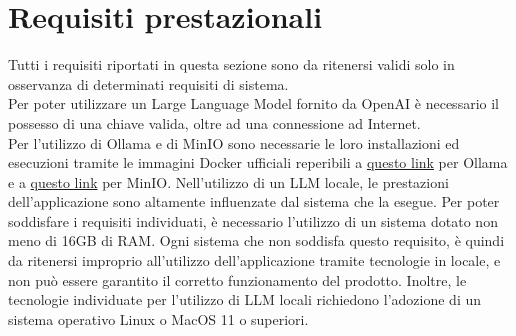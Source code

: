 \section{Requisiti prestazionali}
Tutti i requisiti riportati in questa sezione sono da ritenersi validi solo in osservanza di determinati requisiti di sistema.\\
Per poter utilizzare un Large Language Model fornito da OpenAI è necessario il possesso di una chiave  valida, oltre ad una connessione ad Internet.\\
Per l'utilizzo di Ollama e di MinIO sono necessarie le loro installazioni ed esecuzioni tramite le immagini Docker ufficiali reperibili a \href{https://ollama.ai/blog/ollama-is-now-available-as-an-official-docker-image}{questo link} per Ollama e a \href{https://min.io/docs/minio/container/index.html}{questo link} per MinIO.
Nell'utilizzo di un LLM locale, le prestazioni dell'applicazione sono altamente influenzate dal sistema che la esegue. Per poter soddisfare i requisiti individuati, è necessario l'utilizzo di un sistema dotato non meno di 16GB di RAM. Ogni sistema che non soddisfa questo requisito, è quindi da ritenersi improprio all'utilizzo dell'applicazione tramite tecnologie in locale, e non può essere garantito il corretto funzionamento del prodotto. Inoltre, le tecnologie individuate per l'utilizzo di LLM locali richiedono l'adozione di un sistema operativo Linux o MacOS 11 o superiori.
   
   

